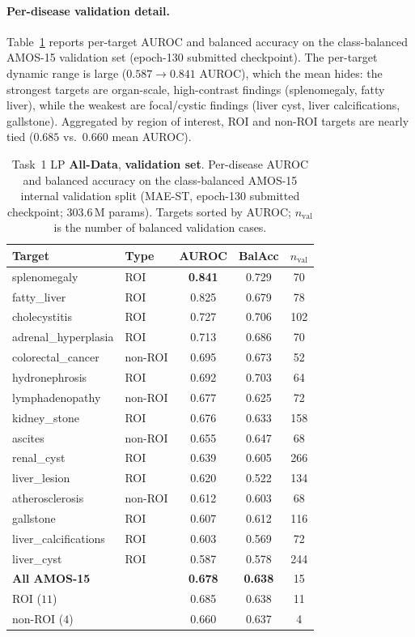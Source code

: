 \documentclass[runningheads]{llncs}
\begin{document}
\paragraph{Per-disease validation detail.}
Table~\ref{tab:results-lp} reports per-target AUROC and balanced accuracy on the
class-balanced AMOS-15 validation set (epoch-130 submitted checkpoint). The
per-target dynamic range is large ($0.587\!\to\!0.841$ AUROC), which the mean
hides: the strongest targets are organ-scale, high-contrast findings
(splenomegaly, fatty liver), while the weakest are focal/cystic findings
(liver cyst, liver calcifications, gallstone). Aggregated by region of interest,
ROI and non-ROI targets are nearly tied ($0.685$ vs.\ $0.660$ mean AUROC).

\begin{table}[htbp]
\caption{Task~1 LP \textbf{All-Data}, \textbf{validation set}. Per-disease AUROC
and balanced accuracy on the class-balanced AMOS-15 internal validation split
(MAE-ST, epoch-130 submitted checkpoint; $303.6$\,M params). Targets sorted by
AUROC; $n_\text{val}$ is the number of balanced validation cases.}
\label{tab:results-lp}
\centering
\begin{tabular}{llccc}
\hline
Target & Type & AUROC & BalAcc & $n_\text{val}$ \\ \hline
splenomegaly         & ROI     & \textbf{0.841} & 0.729 & 70  \\ \hline
fatty\_liver          & ROI     & 0.825 & 0.679 & 78  \\ \hline
cholecystitis        & ROI     & 0.727 & 0.706 & 102 \\ \hline
adrenal\_hyperplasia  & ROI     & 0.713 & 0.686 & 70  \\ \hline
colorectal\_cancer    & non-ROI & 0.695 & 0.673 & 52  \\ \hline
hydronephrosis       & ROI     & 0.692 & 0.703 & 64  \\ \hline
lymphadenopathy      & non-ROI & 0.677 & 0.625 & 72  \\ \hline
kidney\_stone         & ROI     & 0.676 & 0.633 & 158 \\ \hline
ascites              & non-ROI & 0.655 & 0.647 & 68  \\ \hline
renal\_cyst           & ROI     & 0.639 & 0.605 & 266 \\ \hline
liver\_lesion         & ROI     & 0.620 & 0.522 & 134 \\ \hline
atherosclerosis      & non-ROI & 0.612 & 0.603 & 68  \\ \hline
gallstone            & ROI     & 0.607 & 0.612 & 116 \\ \hline
liver\_calcifications & ROI     & 0.603 & 0.569 & 72  \\ \hline
liver\_cyst           & ROI     & 0.587 & 0.578 & 244 \\ \hline
\textbf{All AMOS-15}  &         & \textbf{0.678} & \textbf{0.638} & 15 \\ \hline
ROI ($11$)           &         & 0.685 & 0.638 & 11 \\ \hline
non-ROI ($4$)        &         & 0.660 & 0.637 & 4  \\ \hline
\end{tabular}
\end{table}
\end{document}
